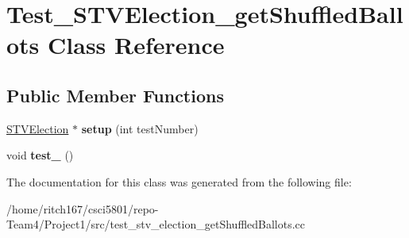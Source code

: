 \hypertarget{classTest__STVElection__getShuffledBallots}{}\section{Test\+\_\+\+S\+T\+V\+Election\+\_\+get\+Shuffled\+Ballots Class Reference}
\label{classTest__STVElection__getShuffledBallots}
\subsection*{Public Member Functions}
\begin{DoxyCompactItemize}
\item 
\mbox{\label{classTest__STVElection__getShuffledBallots_a6c481b813b53cc92182f003188bdee84}} 
\hyperlink{classSTVElection}{S\+T\+V\+Election} $\ast$ {\bfseries setup} (int test\+Number)
\item 
\mbox{\label{classTest__STVElection__getShuffledBallots_a010b63e011817519ad421fb8238d6e0e}} 
void {\bfseries test\+\_} ()
\end{DoxyCompactItemize}


The documentation for this class was generated from the following file\+:\begin{DoxyCompactItemize}
\item 
/home/ritch167/csci5801/repo-\/\+Team4/\+Project1/src/test\+\_\+stv\+\_\+election\+\_\+get\+Shuffled\+Ballots.\+cc\end{DoxyCompactItemize}
